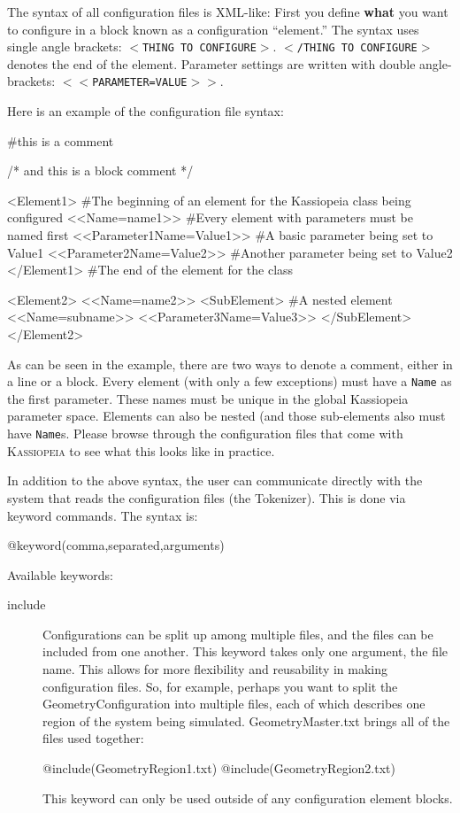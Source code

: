 The syntax of all configuration files is XML-like: First you define \textbf{what} you want to configure in a block known as a configuration ``element.''  The syntax uses single angle brackets: \texttt{$<$THING TO CONFIGURE$>$}. \texttt{$<$/THING TO CONFIGURE$>$} denotes the end of the element. Parameter settings are written with double angle-brackets: \texttt{$<<$PARAMETER=VALUE$>>$}.

Here is an example of the configuration file syntax:
\begin{DoxyCode}
#this is a comment

/*
and this is
a block comment
*/

<Element1>                      #The beginning of an element for the Kassiopeia class being configured
    <<Name=name1>>              #Every element with parameters must be named first
    <<Parameter1Name=Value1>>   #A basic parameter being set to Value1
    <<Parameter2Name=Value2>>   #Another parameter being set to Value2
</Element1>                     #The end of the element for the class

<Element2>
    <<Name=name2>>
    <SubElement>                #A nested element
        <<Name=subname>>
        <<Parameter3Name=Value3>>
    </SubElement>
</Element2>
\end{DoxyCode}
As can be seen in the example, there are two ways to denote a comment, either in a line or a block.  Every element (with only a few exceptions) must have a \texttt{Name} as the first parameter.  These names must be unique in the global Kassiopeia parameter space.  Elements can also be nested (and those sub-elements also must have \texttt{Name}s.  Please browse through the configuration files that come with \textsc{Kassiopeia} to see what this looks like in practice.

In addition to the above syntax, the user can communicate directly with the system that reads the configuration files (the Tokenizer).  This is done via keyword commands.  The syntax is:
\begin{DoxyCode}
@keyword(comma,separated,arguments)
\end{DoxyCode}

Available keywords:
\begin{description}
	\item[include] Configurations can be split up among multiple files, and the files can be included from one another.  This keyword takes only one argument, the file name. This allows for more flexibility and reusability in making configuration files.  So, for example, perhaps you want to split the GeometryConfiguration into multiple files, each of which describes one region of the system being simulated.  GeometryMaster.txt brings all of the files used together:
\begin{DoxyCode}
@include(GeometryRegion1.txt)
@include(GeometryRegion2.txt)
\end{DoxyCode}
This keyword can only be used outside of any configuration element blocks.
\end{description}
 


